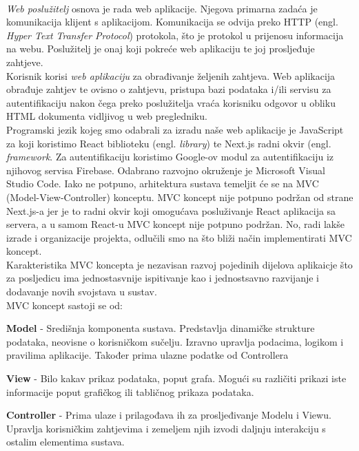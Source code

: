 \newline
\\
\textit{Web poslužitelj} osnova je rada web aplikacije. Njegova primarna zadaća je komunikacija klijent s aplikacijom. Komunikacija se odvija preko HTTP (engl. \textit{Hyper Text Transfer Protocol}) protokola, što je protokol u prijenosu informacija na webu. Poslužitelj je onaj koji pokreće web aplikaciju te joj prosljeđuje zahtjeve.
\newline
\\
Korisnik korisi \textit{web aplikaciju} za obrađivanje željenih zahtjeva. Web aplikacija obrađuje zahtjev te ovisno o zahtjevu, pristupa bazi podataka i/ili servisu za autentifikaciju nakon čega preko poslužitelja vraća korisniku odgovor u obliku HTML dokumenta vidljivog u web pregledniku.
\newline
\\
Programski jezik kojeg smo odabrali za izradu naše web aplikacije je JavaScript za koji koristimo React biblioteku (engl. \textit{library}) te Next.js radni okvir (engl. \textit{framework}. Za autentifikaciju koristimo Google-ov modul za autentifikaciju iz njihovog servisa Firebase. Odabrano razvojno okruženje je Microsoft Visual Studio Code. Iako ne potpuno, arhitektura sustava temeljit će se na MVC (Model-View-Controller) konceptu. MVC koncept nije potpuno podržan od strane Next.js-a jer je to radni okvir koji omogućava posluživanje React aplikacija sa servera, a u samom React-u MVC koncept nije potpuno podržan. No, radi lakše izrade i organizacije projekta, odlučili smo na što bliži način implementirati MVC koncept.
\newline
\\
Karakteristika MVC koncepta je nezavisan razvoj pojedinih dijelova aplikaicje što za posljedicu ima jednostasvnije ispitivanje kao i jednostsavno razvijanje i dodavanje novih svojstava u sustav.
\newline
\\
MVC koncept sastoji se od:

\begin{packed_item}
	
        	\item  \textbf{Model} - Središnja komponenta sustava. Predstavlja dinamičke strukture podataka, neovisne o korisničkom sučelju. Izravno upravlja podacima, logikom i pravilima aplikacije. Također prima ulazne podatke od Controllera
        	\item \textbf{View} - Bilo kakav prikaz podataka, poput grafa. Mogući su različiti prikazi iste informacije poput grafičkog ili tabličnog prikaza podataka.
        	\item  \textbf{Controller} - Prima ulaze i prilagođava ih za prosljeđivanje Modelu i Viewu. Upravlja korisničkim zahtjevima i zemeljem njih izvodi daljnju interakciju s ostalim elementima sustava.
            \end{packed_item}


